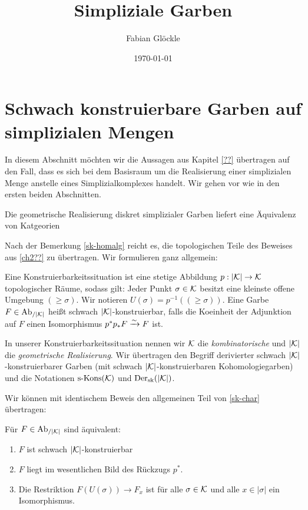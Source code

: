 



\title{Simpliziale Garben}
\author{Fabian Glöckle}
\date{\today}

\section{Schwach konstruierbare Garben auf simplizialen Mengen}

In diesem Abschnitt möchten wir die Aussagen aus Kapitel \ref{??}
übertragen auf den Fall, dass es sich bei dem Basisraum um die
Realisierung einer simplizialen Menge anstelle eines
Simplizialkomplexes handelt. Wir gehen vor wie in den ersten beiden
Abschnitten.
\begin{prop}
  Die geometrische Realisierung diskret simplizialer Garben liefert
  eine Äquivalenz von Katgeorien %
\end{prop}

Nach der Bemerkung \ref{sk-homalg} reicht es, die topologischen Teile
des Beweises aus \ref{ch2??} zu übertragen. Wir formulieren ganz
allgemein:
\begin{defn}
  Eine Konstruierbarkeitssituation ist eine stetige Abbildung $p: |\mathcal{K}|
  \to \mathcal{K}$ topologischer Räume, sodass gilt: Jeder Punkt $\sigma \in
  \mathcal{K}$ besitzt eine kleinste offene Umgebung $(\geq \sigma)$. Wir
  notieren $U(\sigma) = p^{-1}((\geq \sigma))$. Eine Garbe $F \in
  \operatorname{Ab}_{/|\mathcal{K}|}$ heißt schwach $|\mathcal{K}|$-konstruierbar, falls die Koeinheit der
  Adjunktion auf $F$ einen Isomorphismus $p^* p_* F \xrightarrow[]{\sim} F$ ist.
\end{defn}
In unserer Konstruierbarkeitssituation nennen wir $\mathcal{K}$ die
\emph{kombinatorische} und $|\mathcal{K}|$ die \emph{geometrische
  Realisierung}. Wir übertragen den Begriff derivierter schwach
$|\mathcal{K}|$-konstruierbarer Garben (mit schwach $|\mathcal{K}|$-konstruierbaren
Kohomologiegarben) und die Notationen $\operatorname{s-Kons}(\mathcal{K})$ und $\operatorname{Der}_{\mathrm{sk}}(|\mathcal{K}|)$.

Wir können mit identischem Beweis den allgemeinen Teil von
\ref{sk-char} übertragen:
\begin{prop} \label{gensk-char}
  Für $F \in \operatorname{Ab}_{/|\mathcal{K}|}$ sind äquivalent:
  \begin{enumerate}[label=(\arabic*)]
  \item \label{itm:gensk-char-sk} $F$ ist schwach $|\mathcal{K}|$-konstruierbar
  \item \label{itm:gensk-char-essim} $F$ liegt im wesentlichen Bild
    des Rückzugs $p^*$.
  \item \label{itm:gensk-char-res} Die Restriktion $F(U(\sigma)) \to
    F_x$ ist für alle $\sigma \in \mathcal{K}$ und alle $x \in |\sigma|$ ein
    Isomorphismus.
  \end{enumerate}
\end{prop}

